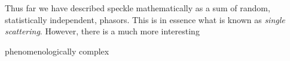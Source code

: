 Thus far we have described speckle mathematically as a sum of random,
statistically independent, phasors.  This is in essence what is known as
\textit{single scattering}.  However, there is a much more interesting 

phenomenologically complex 
